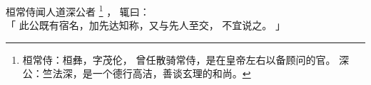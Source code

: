 
\switchcolumn*[\section{}]

桓常侍闻人道深公者%
\footnote{%
    桓常侍：桓彝，字茂伦，
            曾任散骑常侍，是在皇帝左右以备顾问的官。
    深公：竺法深，是一个德行高洁，善谈玄理的和尚。
}%
，
辄曰：\\「
    此公既有宿名，加先达知称，又与先人至交，
    不宜说之。
」

\switchcolumn



